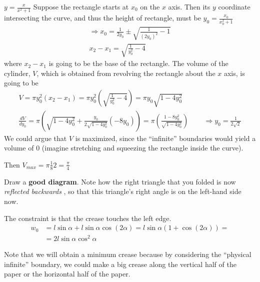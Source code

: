 \documentclass[twoside]{amsart}
\theoremstyle{plain}
\theoremstyle{definition}
\newcommand{\exercisehead}[1]
  {\smallskip
   \noindent{\small\bf Exercise #1.}}
\begin{document}
\exercisehead{20}  $y = \frac{x}{x^2 + 1}$ Suppose the rectangle starts at $x_0$ on the $x$ axis.  Then its $y$ coordinate intersecting the curve, and thus the height of rectangle, must be $y_0 = \frac{x_0}{ x_0^2 + 1}$ 
\[
\begin{gathered}
  \Longrightarrow   x_0 = \frac{1}{ 2 y_0} \pm \sqrt{ \frac{1}{ (2y_0)^2 } - 1 } \\ 
  x_2 - x_1 = \sqrt{ \frac{1}{y_0^2} - 4 } 
\end{gathered}
\]
where $x_2 - x_1$ is going to be the base of the rectangle.  The volume of the cylinder, $V$, which is obtained from revolving the rectangle about the $x$ axis, is going to be
\[
\begin{gathered}
  V = \pi y_0^2 (x_2 - x_1) = \pi y_0^2 \left( \sqrt{ \frac{ 1}{y_0^2} - 4  } \right) = \pi y_0 \sqrt{ 1 - 4y_0^2 } \\
  \frac{dV}{dy_0} = \pi \left( \sqrt{ 1 -4 y_0^2 } + \frac{ y_0}{ 2 \sqrt{ 1 - 4 y_0^2 } } (-8y_0 ) \right) = \pi \left( \frac{ 1 - 8y_0^2 }{ \sqrt{ 1 - 4 y_0^2 } } \right) \quad \quad \, \Longrightarrow y_0 = \frac{1}{ 2 \sqrt{2}}
\end{gathered}
\]
We could argue that $V$ is maximized, since the ``infinite'' boundaries would yield a volume of $0$ (imagine stretching and squeezing the rectangle inside the curve).  

Then $V_{max} = \pi \frac{1}{8}  2 = \boxed{ \frac{ \pi}{4} }$

\exercisehead{21}  Draw a \textbf{ good diagram}.  Note how the right triangle that you folded is now \emph{ reflected backwards }, so that this triangle's right angle is on the left-hand side now.  

The constraint is that the crease touches the left edge.  
\[
\begin{aligned}
  w_0 & = l \sin{\alpha} + l \sin{\alpha} \cos{ (2\alpha)} = l \sin{\alpha} ( 1 + \cos{ (2\alpha) } ) = \\
  & = 2 l \sin{\alpha} \cos^2{\alpha}
\end{aligned}
\]

Note that we will obtain a minimum crease because by considering the ``physical infinite'' boundary, we could make a big crease along the vertical half of the paper or the horizontal half of the paper.  
\end{document}
